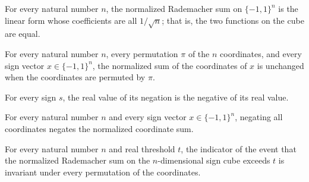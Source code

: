 \begin{theorem}
\label{FABL.normalizedRademacherSum_eq_linearForm}
\leanok
{}
For every natural number $n$, the normalized Rademacher sum on $\{-1,1\}^n$ is the
linear form whose coefficients are all $1/\sqrt n$; that is, the two functions on the
cube are equal.
\end{theorem}

\begin{theorem}
\label{FABL.normalizedRademacherSum_permuteInput}
\leanok
{}
For every natural number $n$, every permutation $\pi$ of the $n$ coordinates, and every
sign vector $x\in\{−1,1\}^n$, the normalized sum of the coordinates of $x$ is unchanged
when the coordinates are permuted by $\pi$.
\end{theorem}

\begin{theorem}
\label{FABL.signValue_neg_hammingBall}
\leanok
{}
For every sign $s$, the real value of its negation is the negative of its real value.
\end{theorem}

\begin{theorem}
\label{FABL.normalizedRademacherSum_neg}
\leanok
{}
For every natural number $n$ and every sign vector $x\in\{-1,1\}^n$, negating all
coordinates negates the normalized coordinate sum.
\end{theorem}

\begin{theorem}
\label{FABL.hammingUpperTailIndicator_isSymmetric}
\leanok
{}
For every natural number $n$ and real threshold $t$, the indicator of the event that the
normalized Rademacher sum on the $n$-dimensional sign cube exceeds $t$ is invariant
under every permutation of the coordinates.
\end{theorem}

